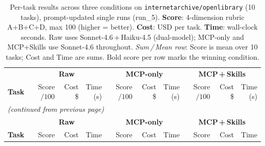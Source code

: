 \documentclass[10pt]{article}
\begin{document}
\pagestyle{empty}

%
\begin{longtable}{@{}
    l
    | r r r
    | r r r
    | r r r
  @{}}

\caption{%
  Per-task results across three conditions on \texttt{internetarchive/openlibrary} (10 tasks),
  prompt-updated single runs (run\_5).
  \textbf{Score}: 4-dimension rubric A+B+C+D, max 100 (higher = better).
  \textbf{Cost}: USD per task.
  \textbf{Time}: wall-clock seconds.
  Raw uses Sonnet-4.6\,+\,Haiku-4.5 (dual-model); MCP-only and MCP+Skills use Sonnet-4.6 throughout.
  \emph{Sum\,/\,Mean row}: Score is mean over 10 tasks; Cost and Time are sums.
  Bold score per row marks the winning condition.
}\label{tab:prompt-updated}\\

\toprule
& \multicolumn{3}{c|}{\cellcolor{rawbg}\textbf{Raw}}
& \multicolumn{3}{c|}{\cellcolor{mcpbg}\textbf{MCP-only}}
& \multicolumn{3}{c}{\cellcolor{skillsbg}\textbf{MCP\,+\,Skills}} \\
\cmidrule(lr){2-4}\cmidrule(lr){5-7}\cmidrule(lr){8-10}
\textbf{Task}
  & \makecell{Score\\$/100$} & \makecell{Cost\\\$} & \makecell{Time\\(s)}
  & \makecell{Score\\$/100$} & \makecell{Cost\\\$} & \makecell{Time\\(s)}
  & \makecell{Score\\$/100$} & \makecell{Cost\\\$} & \makecell{Time\\(s)} \\
\midrule
\endfirsthead

\multicolumn{10}{l}{\footnotesize\itshape (continued from previous page)}\\[2pt]
\toprule
& \multicolumn{3}{c|}{\cellcolor{rawbg}\textbf{Raw}}
& \multicolumn{3}{c|}{\cellcolor{mcpbg}\textbf{MCP-only}}
& \multicolumn{3}{c}{\cellcolor{skillsbg}\textbf{MCP\,+\,Skills}} \\
\cmidrule(lr){2-4}\cmidrule(lr){5-7}\cmidrule(lr){8-10}
\textbf{Task}
  & Score & Cost & Time
  & Score & Cost & Time
  & Score & Cost & Time \\
\midrule
\endhead


\end{longtable}
\end{document}
